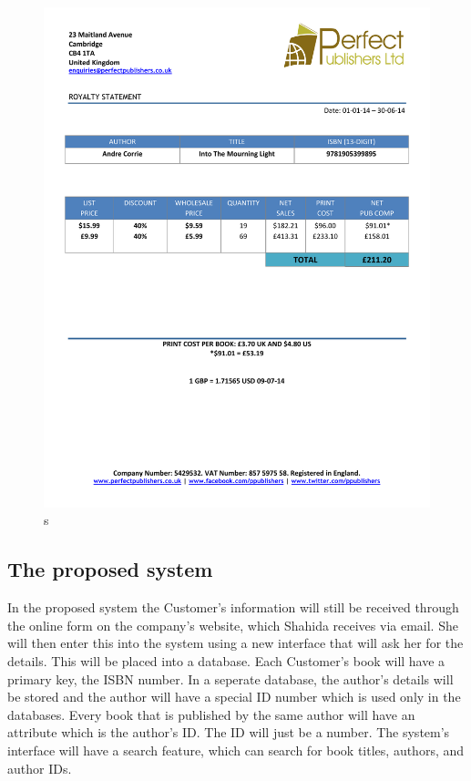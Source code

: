 \begin{figure}[H]
    \includegraphics[width=\textwidth]{./Analysis/Royalty Statement Example.pdf}
    \caption{s}
\end{figure}

\subsection{The proposed system}

In the proposed system the Customer's information will still be received through the online form on the company's website, which Shahida receives via email. She will then enter this into the system using a new interface that will ask her for the details. This will be placed into a database. Each Customer's book will have a primary key, the ISBN number. In a seperate database, the author's details will be stored and the author will have a special ID number which is used only in the databases. Every book that is published by the same author will have an attribute which is the author's ID. The ID will just be a number. The system's interface will have a search feature, which can search for book titles, authors, and author IDs.

